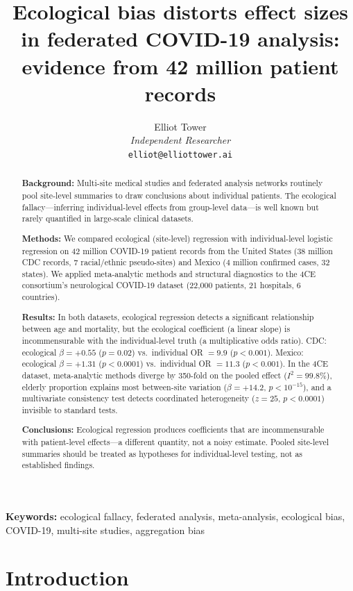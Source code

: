 \documentclass[11pt]{article}
\title{Ecological bias distorts effect sizes in federated COVID-19 analysis:\\ evidence from 42 million patient records}
\author{Elliot Tower\\
\textit{Independent Researcher}\\
\texttt{elliot@elliottower.ai}}
\date{}
\begin{document}
\maketitle

\begin{abstract}
\noindent\textbf{Background:}
Multi-site medical studies and federated analysis networks routinely pool
site-level summaries to draw conclusions about individual patients.  The
ecological fallacy---inferring individual-level effects from group-level
data---is well known but rarely quantified in large-scale clinical
datasets.

\noindent\textbf{Methods:}
We compared ecological (site-level) regression with individual-level
logistic regression on 42 million COVID-19 patient records from the United
States (38 million CDC records, 7 racial/ethnic pseudo-sites) and Mexico
(4 million confirmed cases, 32 states).  We applied meta-analytic methods
and structural diagnostics to the 4CE consortium's neurological COVID-19
dataset (22,000 patients, 21 hospitals, 6 countries).

\noindent\textbf{Results:}
In both datasets, ecological regression detects a significant relationship
between age and mortality, but the ecological coefficient (a linear slope)
is incommensurable with the individual-level truth (a multiplicative odds
ratio).  CDC: ecological $\beta = +0.55$ ($p = 0.02$) vs.\ individual
OR $= 9.9$ ($p < 0.001$).  Mexico: ecological $\beta = +1.31$
($p < 0.0001$) vs.\ individual OR $= 11.3$ ($p < 0.001$).  In the 4CE
dataset, meta-analytic methods diverge by 350-fold on the pooled effect
($I^2 = 99.8\%$), elderly proportion explains most between-site variation
($\beta = +14.2$, $p < 10^{-15}$), and a multivariate consistency test
detects coordinated heterogeneity ($z = 25$, $p < 0.0001$) invisible to
standard tests.

\noindent\textbf{Conclusions:}
Ecological regression produces coefficients that are incommensurable with
patient-level effects---a different quantity, not a noisy estimate.
Pooled site-level summaries should be treated as hypotheses for
individual-level testing, not as established findings.
\end{abstract}

\noindent\textbf{Keywords:} ecological fallacy, federated analysis,
meta-analysis, ecological bias, COVID-19, multi-site studies,
aggregation bias


\section{Introduction}
\end{document}

